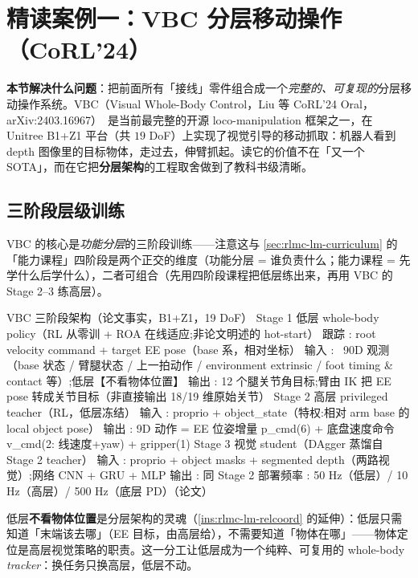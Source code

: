 \section{精读案例一：VBC 分层移动操作（CoRL'24）}
\label{sec:rlmc-lm-vbc}

\textbf{本节解决什么问题}：把前面所有「接线」零件组合成一个\emph{完整的、可复现的}分层移动操作系统。VBC（Visual Whole-Body Control，Liu 等 CoRL'24 Oral，arXiv:2403.16967）\,\cite{liu2024vbc} 是当前最完整的开源 loco-manipulation 框架之一，在 Unitree B1+Z1 平台（共 $19$ DoF）上实现了视觉引导的移动抓取：机器人看到 depth 图像里的目标物体，走过去，伸臂抓起。读它的价值不在「又一个 SOTA」，而在它把\textbf{分层架构}的工程取舍做到了教科书级清晰。

\subsection{三阶段层级训练}
\label{sec:rlmc-lm-vbc-arch}

VBC 的核心是\emph{功能分层}的三阶段训练——注意这与 \cref{sec:rlmc-lm-curriculum} 的「能力课程」四阶段是两个正交的维度（功能分层 = 谁负责什么；能力课程 = 先学什么后学什么），二者可组合（先用四阶段课程把低层练出来，再用 VBC 的 Stage 2--3 练高层）。

\begin{codebox}[text]{VBC 三阶段架构（论文事实，B1+Z1，19 DoF）}
Stage 1  低层 whole-body policy（RL 从零训 + ROA 在线适应;非论文明述的 hot-start）
  跟踪 : root velocity command + target EE pose（base 系，相对坐标）
  输入 : ~90D 观测（base 状态 / 臂腿状态 / 上一拍动作 / environment extrinsic /
         foot timing & contact 等）;低层【不看物体位置】
  输出 : 12 个腿关节角目标;臂由 IK 把 EE pose 转成关节目标（非直接输出 18/19 维原始关节）
Stage 2  高层 privileged teacher（RL，低层冻结）
  输入 : proprio + object_state（特权:相对 arm base 的 local object pose）
  输出 : 9D 动作 = EE 位姿增量 p_cmd(6) + 底盘速度命令 v_cmd(2: 线速度+yaw) + gripper(1)
Stage 3  视觉 student（DAgger 蒸馏自 Stage 2 teacher）
  输入 : proprio + object masks + segmented depth（两路视觉）;网络 CNN + GRU + MLP
  输出 : 同 Stage 2
部署频率 : 50 Hz（低层）/ 10 Hz（高层）/ 500 Hz（底层 PD）（论文）
\end{codebox}

低层\textbf{不看物体位置}是分层架构的灵魂（\cref{ins:rlmc-lm-relcoord} 的延伸）：低层只需知道「末端该去哪」（EE 目标，由高层给），不需要知道「物体在哪」——物体定位是高层视觉策略的职责。这一分工让低层成为一个纯粹、可复用的 whole-body \emph{tracker}：换任务只换高层，低层不动。

